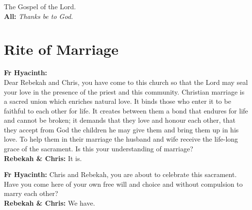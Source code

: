 \documentclass[12pt,landscape]{article}
\begin{document}
\begin{multicols}{2}
\vspace{0.5em}

The Gospel of the Lord.\\
\textbf{All:} \textit{Thanks be to God.}

\vspace{1em}

\section*{Rite of Marriage}

\textbf{Fr Hyacinth:} \\
Dear Rebekah and Chris, you have come to this church so that the Lord may seal your love in the presence of the priest and this community. Christian marriage is a sacred union which enriches natural love. It binds those who enter it to be faithful to each other for life. It creates between them a bond that endures for life and cannot be broken; it demands that they love and honour each other, that they accept from God the children he may give them and bring them up in his love. To help them in their marriage the husband and wife receive the life-long grace of the sacrament. Is this your understanding of marriage?\\

\textbf{Rebekah \& Chris:} It is.

\vspace{0.5em}

\textbf{Fr Hyacinth:} Chris and Rebekah, you are about to celebrate this sacrament. Have you come here of your own free will and choice and without compulsion to marry each other?\\

\textbf{Rebekah \& Chris:} We have.

\end{multicols}
\end{document}
